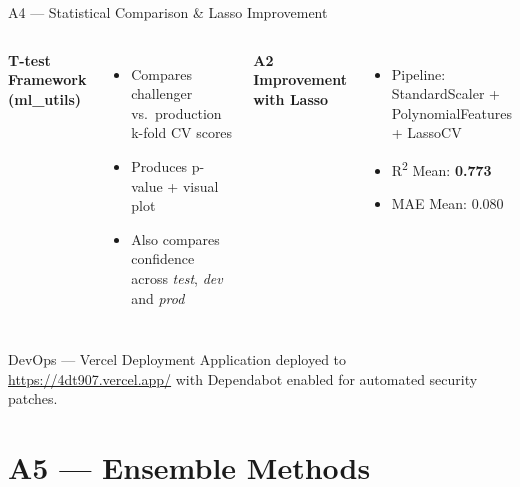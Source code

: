 \documentclass{beamer}
\begin{document}
\begin{frame}{A4 --- Statistical Comparison \& Lasso Improvement}
    \begin{columns}
        \textbf{T-test Framework (ml\_utils)}
        \begin{itemize}
            \item Compares challenger vs.\ production k-fold CV scores
            \item Produces p-value + visual plot
            \item Also compares confidence across \textit{test}, \textit{dev} and \textit{prod}
        \end{itemize}

        \textbf{A2 Improvement with Lasso}
        \begin{itemize}
            \item Pipeline: StandardScaler + PolynomialFeatures + LassoCV
            \item R\textsuperscript{2} Mean: \textbf{0.773}
            \item MAE Mean: 0.080
        \end{itemize}
    \end{columns}
    \vspace{0.5em}
    \begin{block}{DevOps --- Vercel Deployment}
        Application deployed to \url{https://4dt907.vercel.app/} with
        Dependabot enabled for automated security patches.
    \end{block}
\end{frame}

\section{A5 --- Ensemble Methods}
\end{document}
